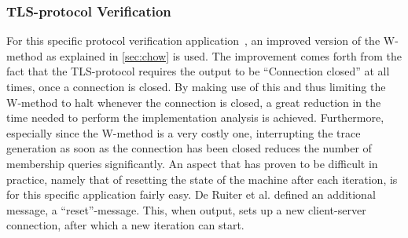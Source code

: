 \documentclass[multi,crop=false,class=article]{standalone}
\begin{document}
\subsubsection{TLS-protocol Verification} For this specific protocol verification
application~\cite{deRuiter2015}, an improved version of the W-method as explained
in \cref{sec:chow} is used. The improvement comes forth from the fact that the
TLS-protocol requires the output to be ``Connection closed'' at all times, once
a connection is closed. By making use of this and thus limiting the W-method to
halt whenever the connection is closed, a great reduction in the time needed to
perform the implementation analysis is achieved. Furthermore, especially since
the W-method is a very costly one, interrupting the trace generation as soon as
the connection has been closed reduces the number of membership queries
significantly. An aspect that has proven to be difficult in practice, namely
that of resetting the state of the machine after each iteration, is for this
specific application fairly easy. De Ruiter et al. defined an additional
message, a ``reset''-message. This, when output, sets up a new client-server
connection, after which a new iteration can start.
\end{document}
